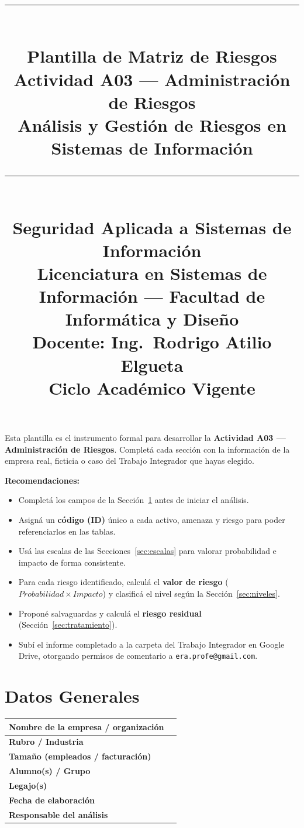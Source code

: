 \documentclass[11pt,a4paper]{article}
\title{%
  \rule{\textwidth}{1pt}\\[0.4cm]
  \textbf{\Large Plantilla de Matriz de Riesgos}\\[0.2cm]
  \large Actividad A03 --- Administración de Riesgos\\[0.1cm]
  \normalsize Análisis y Gestión de Riesgos en Sistemas de Información\\[0.2cm]
  \rule{\textwidth}{1pt}\\[0.4cm]
  \normalsize Seguridad Aplicada a Sistemas de Información\\
  Licenciatura en Sistemas de Información --- Facultad de Informática y Diseño\\
  Docente: Ing.\ Rodrigo Atilio Elgueta\\[0.2cm]
  \small Ciclo Académico Vigente
}
\author{}
\date{}
\begin{document}
\maketitle
\thispagestyle{fancy}
\tableofcontents
\newpage

\begin{instruccion}
Esta plantilla es el instrumento formal para desarrollar la \textbf{Actividad A03 --- Administración de Riesgos}. Completá cada sección con la información de la empresa real, ficticia o caso del Trabajo Integrador que hayas elegido.

\textbf{Recomendaciones:}
\begin{itemize}[leftmargin=*]
  \item Completá los campos de la Sección~\ref{sec:datos} antes de iniciar el análisis.
  \item Asigná un \textbf{código (ID)} único a cada activo, amenaza y riesgo para poder referenciarlos en las tablas.
  \item Usá las escalas de las Secciones~\ref{sec:escalas} para valorar probabilidad e impacto de forma consistente.
  \item Para cada riesgo identificado, calculá el \textbf{valor de riesgo} (\(Probabilidad \times Impacto\)) y clasificá el nivel según la Sección~\ref{sec:niveles}.
  \item Proponé salvaguardas y calculá el \textbf{riesgo residual} (Sección~\ref{sec:tratamiento}).
  \item Subí el informe completado a la carpeta del Trabajo Integrador en Google Drive, otorgando permisos de comentario a \texttt{era.profe@gmail.com}.
\end{itemize}
\end{instruccion}

\section{Datos Generales}\label{sec:datos}

\begin{center}
\renewcommand{\arraystretch}{1.6}
\begin{tabularx}{\textwidth}{@{} p{5cm} X @{}}
\toprule
\textbf{Nombre de la empresa / organización} & \\
\midrule
\textbf{Rubro / Industria} & \\
\midrule
\textbf{Tamaño (empleados / facturación)} & \\
\midrule
\textbf{Alumno(s) / Grupo} & \\
\midrule
\textbf{Legajo(s)} & \\
\midrule
\textbf{Fecha de elaboración} & \\
\midrule
\textbf{Responsable del análisis} & \\
\bottomrule
\end{tabularx}
\end{center}
\end{document}
